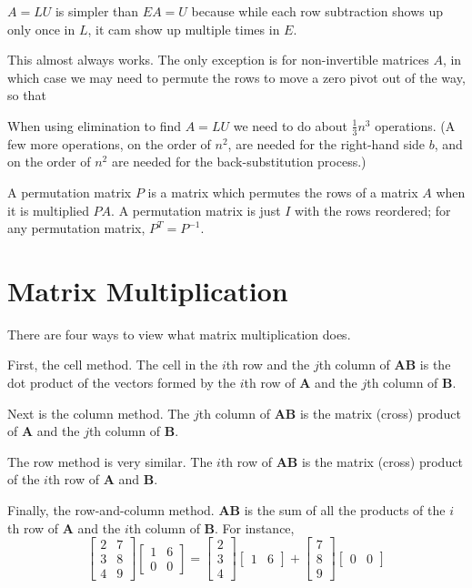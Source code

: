 \documentclass[10pt,letterpaper,twocolumn]{article}
\newcommand{\matr}[1]{\mathbf{#1}}
\begin{document}
$A = LU$ is simpler than $EA = U$ because while each row subtraction shows up only once in $L$, it cam show up multiple times in $E$.

This almost always works. The only exception is for non-invertible matrices $A$, in which case we may need to permute the rows to move a zero pivot out of the way, so that 

When using elimination to find $A = LU$ we need to do about $\frac{1}{3}n^3$ operations. (A few more operations, on the order of $n^2$, are needed for the right-hand side $b$, and on the order of $n^2$ are needed for the back-substitution process.)

A permutation matrix $P$ is a matrix which permutes the rows of a matrix $A$ when it is multiplied $PA$. A permutation matrix is just $I$ with the rows reordered; for any permutation matrix, $P^T = P^{-1}$.
\section{Matrix Multiplication}
There are four ways to view what matrix multiplication does.

First, the cell method. The cell in the $i$th row and the $j$th column of $\matr{A} \matr{B}$ is the dot product of the vectors formed by the $i$th row of $\matr{A}$ and the $j$th column of $\matr{B}$.

Next is the column method. The $j$th column of $\matr{A} \matr{B}$ is the matrix (cross) product of $\matr{A}$ and the $j$th column of $\matr{B}$.

The row method is very similar. The $i$th row of $\matr{A} \matr{B}$ is the matrix (cross) product of the $i$th row of $\matr{A}$ and  $\matr{B}$.

Finally, the row-and-column method. $\matr{A} \matr{B}$ is the sum of all the products of the $i$th row of $\matr{A}$ and the $i$th column of $\matr{B}$. For instance,
$$
\begin{bmatrix}
2 & 7 \\
3 & 8 \\
4 & 9
\end{bmatrix}
\begin{bmatrix}
1 & 6 \\
0 & 0
\end{bmatrix}
=
\begin{bmatrix}
2 \\
3 \\
4
\end{bmatrix}
\begin{bmatrix}
1 & 6
\end{bmatrix}
+
\begin{bmatrix}
7 \\
8 \\
9
\end{bmatrix}
\begin{bmatrix}
0 & 0
\end{bmatrix}
$$
\end{document}
